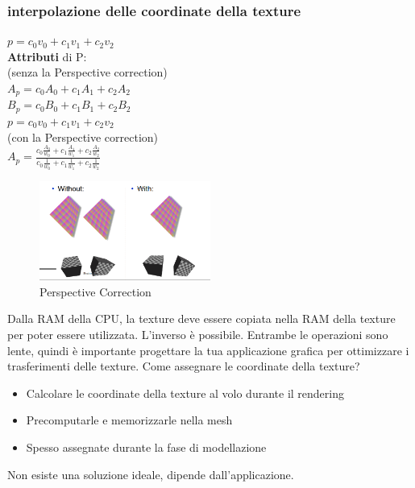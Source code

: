 \subsubsection{interpolazione delle coordinate della texture}
$p=c_0v_0+c_1v_1+c_2v_2$ \\
\vspace{10pt} 
\textbf{Attributi} di P: \\
\vspace{10pt} 
(senza la Perspective correction) \\
\vspace{10pt} 
$A_p=c_0A_0+c_1A_1+c_2A_2$ \\
\vspace{10pt} 
$B_p=c_0B_0+c_1B_1+c_2B_2$ \\
\vspace{10pt} 
$p=c_0v_0+c_1v_1+c_2v_2 $\\
\vspace{10pt} 
(con la Perspective correction) \\
$A_p=\frac{c_0\frac{A_0}{w_0}+c_1\frac{A_1}{w_1}+c_2\frac{A_2}{w_2}}{c_0\frac{1}{w_0}+c_1\frac{1}{w_1}+c_2\frac{1}{w_2}}
$
\begin{figure}[H]
    \centering
    \includegraphics[width=0.5\textwidth]{images/PerspCorr.png} 
    \caption{Perspective Correction}
    \label{fig:immagine}
\end{figure}
Dalla RAM della CPU, la texture deve essere copiata nella RAM della texture per poter essere utilizzata.
L'inverso è possibile.
Entrambe le operazioni sono lente, quindi è importante progettare la tua applicazione grafica per ottimizzare i trasferimenti delle texture.
Come assegnare le coordinate della texture?
\begin{itemize}
    \item Calcolare le coordinate della texture al volo durante il rendering
    \item Precomputarle e memorizzarle nella mesh
    \item Spesso assegnate durante la fase di modellazione
\end{itemize}
Non esiste una soluzione ideale, dipende dall'applicazione.

